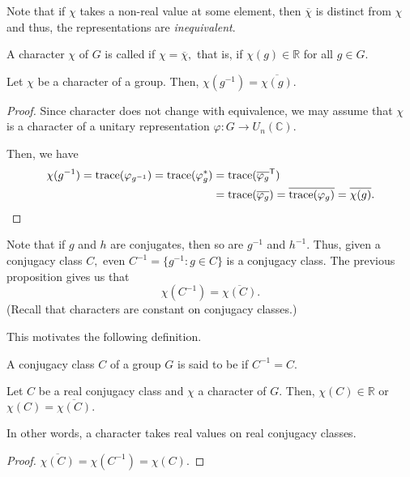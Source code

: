 \begin{rem}
	Note that if $\chi$ takes a non-real value at some element, then $\overline{\chi}$ is distinct from $\chi$ and thus, the representations are \emph{inequivalent}.
\end{rem}

\begin{defn}%
	A character $\chi$ of $G$ is called  if $\chi = \overline{\chi},$ that is, if $\chi(g) \in \mathbb{R}$ for all $g \in G.$
\end{defn}

\begin{prop}
	Let $\chi$ be a character of a group. Then, $\chi(g^{-1}) = \overline{\chi(g)}.$
\end{prop}
\begin{proof} 
	Since character does not change with equivalence, we may assume that $\chi$ is a character of a unitary representation $\varphi : G \to U_n(\mathbb{C}).$

	Then, we have
	\begin{align*} 
		\chi(g^{-1}) = \operatorname{trace}(\varphi_{g^{-1}}) = \operatorname{trace}(\varphi_g^*) &= \operatorname{trace}(\overline{\varphi_g}^\mathsf{T}) \\
		&= \operatorname{trace}(\overline{\varphi_g}) = \overline{\operatorname{trace}(\varphi_g)} = \overline{\chi(g)}. \qedhere
	\end{align*}
\end{proof}

\begin{rem} \label{rem:conjofconjisconj}
	Note that if $g$ and $h$ are conjugates, then so are $g^{-1}$ and $h^{-1}.$ Thus, given a conjugacy class $C,$ even $C^{-1} = \{g^{-1} : g \in C\}$ is a conjugacy class. The previous proposition gives us that
	\begin{equation*} 
		\chi(C^{-1}) = \overline{\chi(C)}.
	\end{equation*}
	(Recall that characters are constant on conjugacy classes.)

	This motivates the following definition.
\end{rem}

\begin{defn}%
	A conjugacy class $C$ of a group $G$ is said to be  if $C^{-1} = C.$
\end{defn}


\begin{prop}
	Let $C$ be a real conjugacy class and $\chi$ a character of $G.$ Then, $\chi(C) \in \mathbb{R}$ or $\chi(C) = \overline{\chi(C)}.$ 
\end{prop}
In other words, a character takes real values on real conjugacy classes.
\begin{proof} 
	$\overline{\chi(C)} = \chi(C^{-1}) = \chi(C).$
\end{proof}

